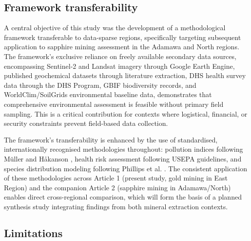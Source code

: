 \documentclass[preprint,12pt,number]{elsarticle}
\begin{document}
\subsection{Framework transferability}

A central objective of this study was the development of a methodological framework transferable to data-sparse regions, specifically targeting subsequent application to sapphire mining assessment in the Adamawa and North regions. The framework's exclusive reliance on freely available secondary data sources, encompassing Sentinel-2 and Landsat imagery through Google Earth Engine, published geochemical datasets through literature extraction, DHS health survey data through the DHS Program, GBIF biodiversity records, and WorldClim/SoilGrids environmental baseline data, demonstrates that comprehensive environmental assessment is feasible without primary field sampling. This is a critical contribution for contexts where logistical, financial, or security constraints prevent field-based data collection.

The framework's transferability is enhanced by the use of standardised, internationally recognised methodologies throughout: pollution indices following M\"{u}ller \cite{Muller1969} and H\r{a}kanson \cite{Hakanson1980}, health risk assessment following USEPA \cite{USEPA2011} guidelines, and species distribution modeling following Phillips et al. \cite{Phillips2006}. The consistent application of these methodologies across Article 1 (present study, gold mining in East Region) and the companion Article 2 (sapphire mining in Adamawa/North) enables direct cross-regional comparison, which will form the basis of a planned synthesis study integrating findings from both mineral extraction contexts.

\subsection{Limitations}
\end{document}
